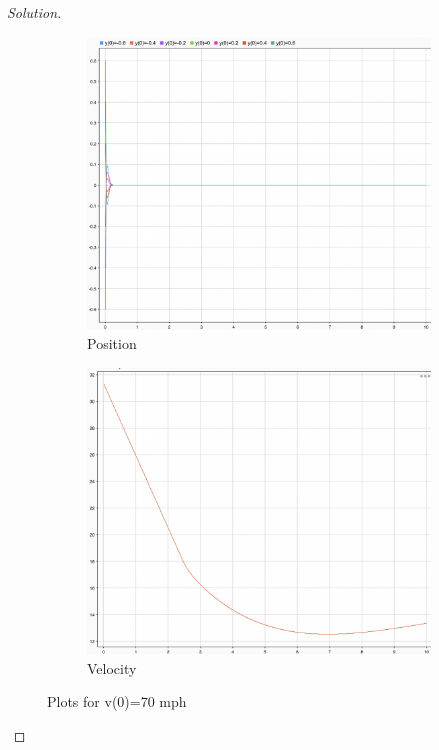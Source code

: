 \documentclass{article}
\begin{document}
\begin{proof}[Solution]
    \begin{figure}[h!]
        \centering
        \begin{subfigure}{0.4\linewidth}
          \includegraphics[width=\linewidth]{img22.png}
          \caption{Position}
        \end{subfigure}
        \begin{subfigure}{0.4\linewidth}
          \includegraphics[width=\linewidth]{img23.png}
          \caption{Velocity}
        \end{subfigure}
        \caption{Plots for v(0)=70 mph}
  \end{figure}


\end{proof}
\end{document}
